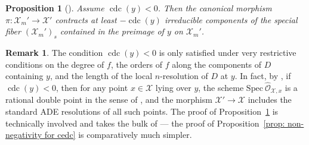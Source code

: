 \documentclass[12pt]{amsart}
\numberwithin{equation}{section}
\newtheorem{prop}[equation]{Proposition}
\theoremstyle{definition}
\newtheorem{remark}[equation]{Remark}
\renewcommand{\O}{\mathcal{O}}
\renewcommand{\P}{\mathbb P}
\newcommand{\Spec}{\mathrm{Spec} \ }
\newcommand{\X}{\mathcal{X}}
\newcommand{\Y}{\mathcal{Y}}
\DeclareMathOperator{\cdc}{cdc}
\begin{document}
\begin{prop}[{\cite[Theorem 1.7]{Part2}}]\label{prop: non-negativity of cdc and existence of contractions}
Assume $\cdc(y)<0$. Then the canonical morphism $\pi: \X_m' \to\X'$ contracts at least $-\cdc(y)$ irreducible components of the special fiber $(\X_{m}')_s$ contained in the preimage of $y$ on $\X_{m}'$.
\end{prop}

\begin{remark}\label{remark: rational double points}
    The condition $\cdc(y)<0$ is only satisfied under very
    restrictive conditions on the degree of $f$, the orders of $f$
    along the components of $D$ containing $y$, and the length of
    the local $n$-resolution of $D$ at $y$. In fact, by
    \cite[Theorem 1.8]{Part2}, if $\cdc(y)<0$, then for any
    point $x\in \X$ lying over $y$, the scheme
    $\Spec\hat{\O}_{\X,x}$ is a rational double point in the
    sense of \cite[Section 24]{Lip69}, and the morphism $\X'\to\X$
    includes the standard ADE resolutions of all such points. The
    proof of Proposition~\ref{prop: non-negativity of cdc and existence of contractions} is technically involved and takes the bulk of
    \cite{Part2} --- the proof of Proposition~\ref{prop:
      non-negativity for cedc} is comparatively much simpler.
\end{remark}
\end{document}
